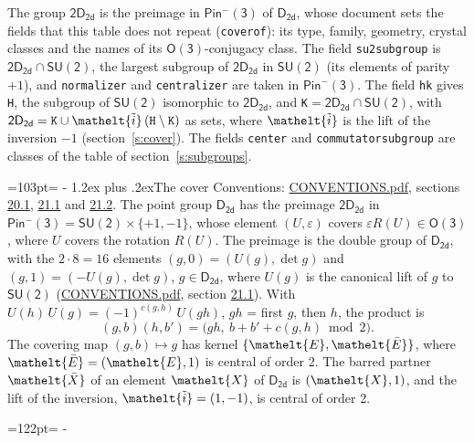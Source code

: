 \documentclass[10pt,a4paper]{article}
\makeatletter
\renewcommand\section{\@startsection{section}{1}{\z@}{-3ex plus -1ex minus -.2ex}%
  {1.2ex plus .2ex}{\normalfont\large\sffamily\bfseries\color{parttitle}}}
\newcommand{\needspace}[1]{\par\penalty-100\begingroup\dimen0=#1\relax\dimen2=\pagegoal
  \advance\dimen2-\pagetotal\ifdim\dimen0>\dimen2\relax\ifdim\dimen2>0pt\vfil\break\fi\fi
  \endgroup}
\numberwithin{equation}{section}
\newcommand{\eltfont}[1]{{\let\sigma\eltsigma\mathelt{#1}}}
\newcommand{\grp}[1]{\mathsf{#1}}
\newcommand{\elt}[1]{\eltfont{#1}}
\newcommand{\dirprod}{\times}
\newcommand{\barred}[1]{\bar{#1}}
\newcommand{\lift}[1]{\tilde{#1}}
\makeatother
\begin{document}
\leavevmode\label{n:element.inversion}\label{n:group.preimage}The group $\grp{2D_{2d}}$ is the preimage in $\grp{Pin^{-}(3)}$ of \href{../../../rotation/data/pdf/D2d.pdf}{$\grp{D_{2d}}$}, whose document sets the fields that this table does not repeat (\texttt{coverof}): its type, family, geometry, crystal classes and the names of its \href{../../../rotation/data/pdf/O3.pdf}{$\grp{O(3)}$}-conjugacy class. The field \texttt{su2subgroup} is $\grp{2D_{2d}} \cap \grp{SU(2)}$, the largest subgroup of $\grp{2D_{2d}}$ in $\grp{SU(2)}$ (its elements of parity $+1$), and \texttt{normalizer} and \texttt{centralizer} are taken in $\grp{Pin^{-}(3)}$. The field \texttt{hk} gives \texttt{H}, the subgroup of $\grp{SU(2)}$ isomorphic to $\grp{2D_{2d}}$, and \texttt{K}${} = \grp{2D_{2d}} \cap \grp{SU(2)}$, with $\grp{2D_{2d}} = \texttt{K} \cup \elt{\lift{i}}\,(\texttt{H} \setminus \texttt{K})$ as sets, where $\elt{\lift{i}}$ is the lift of the inversion $-1$ (section~\ref{s:cover}). The fields \texttt{center} and \texttt{commutatorsubgroup} are classes of the table of section~\ref{s:subgroups}.
\needspace{103pt}
\section{The cover}\label{s:cover}
Conventions: \href{../../CONVENTIONS.pdf}{CONVENTIONS.pdf}, sections \href{../../CONVENTIONS.pdf\#conv.20.1}{20.1}, \href{../../CONVENTIONS.pdf\#conv.21.1}{21.1} and \href{../../CONVENTIONS.pdf\#conv.21.2}{21.2}.
\leavevmode\label{n:group.pin.minus}\label{n:group.su2}\label{n:local.pin.sign}\label{n:matrix.covered}\label{n:matrix.lift.su2}\label{n:index.bar}The point group $\grp{D_{2d}}$ has the preimage $\grp{2D_{2d}}$ in $\grp{Pin^{-}(3)} = \grp{SU(2)} \dirprod \{+1, -1\}$, whose element $(U, \varepsilon)$ covers $\varepsilon R(U) \in \grp{O(3)}$, where $U$ covers the rotation $R(U)$. The preimage is the double group of $\grp{D_{2d}}$, with the $2 \cdot 8 = 16$ elements $(g, 0) = (U(g), \det g)$ and $(g, 1) = (-U(g), \det g)$, $g \in \grp{D_{2d}}$, where $U(g)$ is the canonical lift of $g$ to $\grp{SU(2)}$ (\href{../../CONVENTIONS.pdf}{CONVENTIONS.pdf}, section \href{../../CONVENTIONS.pdf\#conv.21.1}{21.1}). \label{n:function.cocycle}With $U(h)\,U(g) = (-1)^{c(g,h)}\,U(gh)$, $gh$ = first $g$, then $h$, the product is
\begin{equation}\label{e:product}(g, b)(h, b') = \bigl(gh,\ b + b' + c(g, h) \bmod 2\bigr).\end{equation}
\leavevmode\label{n:mark.bar}The covering map $(g, b) \mapsto g$ has kernel $\{\elt{E}, \elt{\barred{E}}\}$, where $\elt{\barred{E}} = (\elt{E}, 1)$ is central of order 2. \label{n:element.named}\label{n:mark.lift}The barred partner $\elt{\barred{X}}$ of an element $\elt{X}$ of $\grp{D_{2d}}$ is $(\elt{X}, 1)$, and the lift of the inversion, $\elt{\lift{i}} = (1, -1)$, is central of order 2.
\needspace{122pt}
\end{document}
